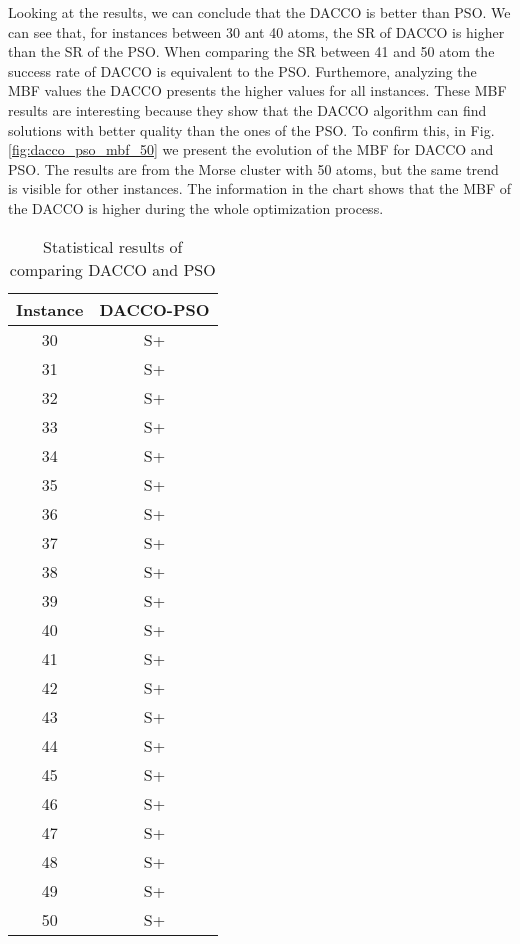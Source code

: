 		Looking at the results, we can conclude that the DACCO is better than PSO. We can see that, for instances between 30 ant 40 atoms, the SR of DACCO is higher than the SR of the PSO. When comparing the SR between 41 and 50 atom the success rate of DACCO is equivalent to the PSO. Furthemore, analyzing the MBF values the DACCO presents the higher values for all instances. These MBF results are interesting because they show that the DACCO algorithm can find solutions with better quality than the ones of the PSO. To confirm this, in Fig. \ref{fig:dacco_pso_mbf_50} we present the evolution of the MBF for DACCO and PSO. The results are from the Morse cluster with 50 atoms, but the same trend is visible for other instances. The information in the chart shows that the MBF of the DACCO is higher during the whole optimization process.
		
		\pagebreak
		\begin{table}[!htdp]
				\label{tab:statistical_comparison_pso}
				\begin{center}
					\begin{tabular}{| c | c |}
						\hline
						\textbf{Instance} & \textbf{DACCO-PSO} \\ \hline
						30 & S+ \\ \hline
						31 & S+ \\ \hline
						32 & S+ \\ \hline
						33 & S+ \\ \hline
						34 & S+ \\ \hline
						35 & S+ \\ \hline
						36 & S+ \\ \hline
						37 & S+ \\ \hline
						38 & S+ \\ \hline
						39 & S+\\ \hline
						40 & S+\\ \hline
						41 & S+ \\ \hline
						42 & S+ \\ \hline
						43 & S+ \\ \hline
						44 & S+ \\ \hline
						45 & S+ \\ \hline
						46 & S+\\ \hline
						47 & S+ \\ \hline
						48 & S+ \\ \hline 
						49 & S+ \\ \hline
						50 & S+ \\ \hline
					\end{tabular}
					\caption{Statistical results of comparing DACCO and PSO}
				\end{center}
		\end{table}
		
